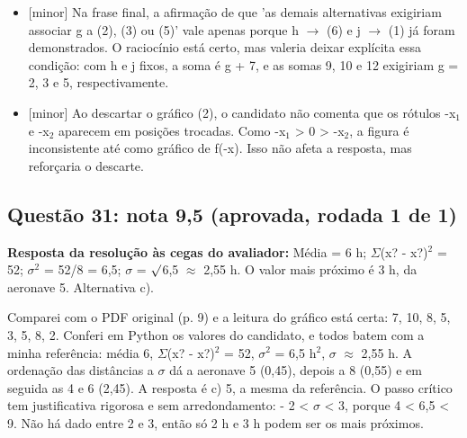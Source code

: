 \documentclass{article}%
\begin{document}
\begin{itemize}%
\item%
{[}minor{]} Na frase final, a afirmação de que 'as demais alternativas exigiriam associar g a (2), (3) ou (5)' vale apenas porque h $\to$ (6) e j $\to$ (1) já foram demonstrados. O raciocínio está certo, mas valeria deixar explícita essa condição: com h e j fixos, a soma é g + 7, e as somas 9, 10 e 12 exigiriam g = 2, 3 e 5, respectivamente.%
\item%
{[}minor{]} Ao descartar o gráfico (2), o candidato não comenta que os rótulos -x$_{1}$ e -x$_{2}$ aparecem em posições trocadas. Como -x$_{1}$ > 0 > -x$_{2}$, a figura é inconsistente até como gráfico de f(-x). Isso não afeta a resposta, mas reforçaria o descarte.%
\end{itemize}%
\subsection*{Questão 31: nota 9,5 (aprovada, rodada 1 de 1)}%
\textbf{Resposta da resolução às cegas do avaliador:} Média = 6 h; $\Sigma$(x? - x?)$^2$ = 52; $\sigma$$^2$ = 52/8 = 6,5; $\sigma$ = $\surd$6,5 $\approx$ 2,55 h. O valor mais próximo é 3 h, da aeronave 5. Alternativa c).\par %
Comparei com o PDF original (p. 9) e a leitura do gráfico está certa: 7, 10, 8, 5, 3, 5, 8, 2. Conferi em Python os valores do candidato, e todos batem com a minha referência: média 6, $\Sigma$(x? - x?)$^2$ = 52, $\sigma$$^2$ = 6,5 h$^2$, $\sigma$ $\approx$ 2,55 h. A ordenação das distâncias a $\sigma$ dá a aeronave 5 (0,45), depois a 8 (0,55) e em seguida as 4 e 6 (2,45). A resposta é c) 5, a mesma da referência.\newline%
\newline%
O passo crítico tem justificativa rigorosa e sem arredondamento:\newline%
{-} 2 < $\sigma$ < 3, porque 4 < 6,5 < 9. Não há dado entre 2 e 3, então só 2 h e 3 h podem ser os mais próximos.\newline%
\end{document}
